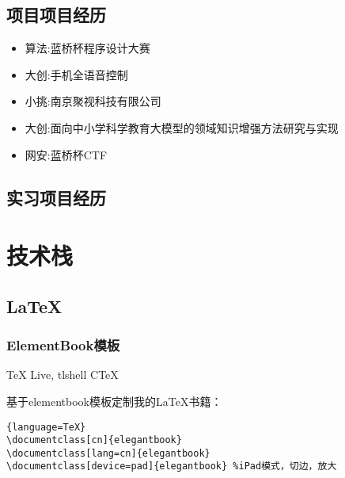 \documentclass[lang=cn,newtx,10pt,color=green,scheme=chinese]{elegantbook}
\begin{document}
\section{项目项目经历}
\begin{itemize}
    \item 算法:蓝桥杯程序设计大赛
    \item 大创:手机全语音控制
    \item 小挑:南京聚视科技有限公司
    \item 大创:面向中小学科学教育大模型的领域知识增强方法研究与实现
    \item 网安:蓝桥杯CTF
\end{itemize}
\section{实习项目经历}

\chapter{技术栈}

\section{\LaTeX{}}
\subsection{ElementBook模板}
\TeX{} Live, tlshell 
CTeX

基于elementbook模板定制我的\LaTeX{}书籍：
\begin{lstlisting}{language=TeX}
\documentclass[cn]{elegantbook} 
\documentclass[lang=cn]{elegantbook}
\documentclass[device=pad]{elegantbook} %iPad模式，切边，放大
\end{lstlisting}
\end{document}
